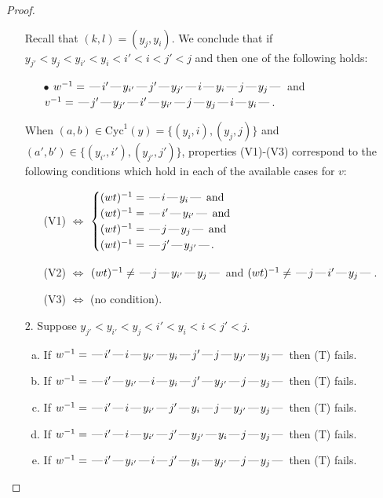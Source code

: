\documentclass[10pt]{article}
\theoremstyle{definition}
\theoremstyle{definition}
\def\dash{\text{\hspace{0.5mm}---\hspace{0.5mm}}}
\def\Cyc{\mathrm{Cyc}}
\begin{document}
\begin{proof}
\begin{enumerate}
\begin{enumerate}[(a)]
\end{enumerate}
Recall that $(k,l) = (y_j,y_i)$.
We conclude that if $y_{j'} < y_j < y_{i'} < y_i < i' < i < j' < j$ and then one of the following holds:
\begin{enumerate}
\item[$\bullet$] $w^{-1} = \dash i'\dash y_{i'}\dash j'\dash y_{j'}\dash i\dash y_i\dash j\dash y_j\dash $ and $v^{-1} = \dash j'\dash y_{j'}\dash i'\dash y_{i'}\dash j\dash y_j\dash i\dash y_i\dash $.
\end{enumerate}
When $(a,b)\in\Cyc^1(y)=\{(y_i,i),(y_j,j)\}$ and $(a',b')\in\{(y_{i'},i'),(y_{j'},j')\}$,
properties (V1)-(V3) correspond to the following conditions which hold in
each of the available cases for $v$:
\begin{enumerate}
\item[](V1) $\Leftrightarrow$ $\begin{cases}\text{$(wt)^{-1} = \dash i \dash y_i \dash$}\text{ and }\\
\text{$(wt)^{-1} = \dash i' \dash y_{i'} \dash$}\text{ and }\\
\text{$(wt)^{-1} = \dash j \dash y_j \dash$}\text{ and }\\
\text{$(wt)^{-1} = \dash j' \dash y_{j'} \dash$}.\end{cases}$
\item[](V2) $\Leftrightarrow$ $(wt)^{-1} \neq \dash j \dash y_{i'} \dash y_j \dash$ and $(wt)^{-1}\neq \dash j \dash i' \dash y_j \dash$.
\item[](V3) $\Leftrightarrow$ (no condition).
\end{enumerate}
\item[$2$.] Suppose $y_{j'} < y_{i'} < y_j < i' < y_i < i < j' < j$.
\begin{enumerate}[(a)]
\item If $w^{-1} = \dash i'\dash i\dash y_{i'}\dash y_i\dash j'\dash j\dash y_{j'}\dash y_j\dash $ then (T) fails.
\item If $w^{-1} = \dash i'\dash y_{i'}\dash i\dash y_i\dash j'\dash y_{j'}\dash j\dash y_j\dash $ then (T) fails.
\item If $w^{-1} = \dash i'\dash i\dash y_{i'}\dash j'\dash y_i\dash j\dash y_{j'}\dash y_j\dash $ then (T) fails.
\item If $w^{-1} = \dash i'\dash i\dash y_{i'}\dash j'\dash y_{j'}\dash y_i\dash j\dash y_j\dash $ then (T) fails.
\item If $w^{-1} = \dash i'\dash y_{i'}\dash i\dash j'\dash y_i\dash y_{j'}\dash j\dash y_j\dash $ then (T) fails.

\end{enumerate}
\end{enumerate}
\end{proof}
\end{document}
